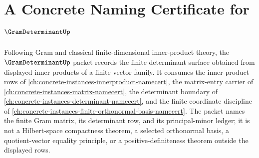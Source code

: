 \chapter{A Concrete Naming Certificate for $\GramDeterminantUp$}
\label{ch:concrete-instances-gram-determinant-namecert}

Following Gram and classical finite-dimensional inner-product theory, the $\GramDeterminantUp$ packet records the finite determinant surface obtained from displayed inner products of a finite vector family. It consumes the inner-product rows of \autoref{ch:concrete-instances-innerproduct-namecert}, the matrix-entry carrier of \autoref{ch:concrete-instances-matrix-namecert}, the determinant boundary of \autoref{ch:concrete-instances-determinant-namecert}, and the finite coordinate discipline of \autoref{ch:concrete-instances-finite-orthonormal-basis-namecert}. The packet names the finite Gram matrix, its determinant row, and its principal-minor ledger; it is not a Hilbert-space compactness theorem, a selected orthonormal basis, a quotient-vector equality principle, or a positive-definiteness theorem outside the displayed rows.


